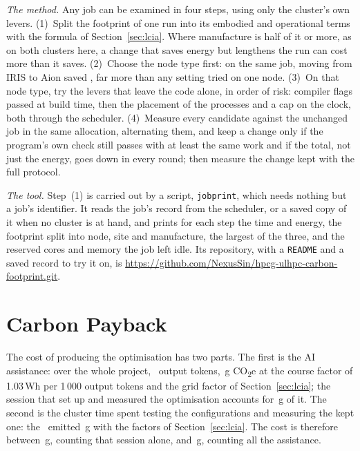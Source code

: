 \documentclass[conference,a4paper]{IEEEtran}
\newcommand{\ProjectRepo}{\url{https://github.com/NexusSin/hpcg-ulhpc-carbon-footprint.git}}
\begin{document}
\emph{The method.} Any job can be examined in four steps, using only the
cluster's own levers. (1)~Split the footprint of one run into its embodied and
operational terms with the formula of Section~\ref{sec:lcia}. Where manufacture
is half of it or more, as on both clusters here, a change that saves energy but
lengthens the run can cost more than it saves. (2)~Choose the node type first:
on the same job, moving from IRIS to Aion saved \AionSave, far more than any
setting tried on one node. (3)~On that node type, try the levers that leave the
code alone, in order of risk: compiler flags passed at build time, then the
placement of the processes and a cap on the clock, both through the scheduler.
(4)~Measure every candidate against the unchanged job in the same allocation,
alternating them, and keep a change only if the program's own check still passes
with at least the same work and if the total, not just the energy, goes down in
every round; then measure the change kept with the full protocol.

\emph{The tool.} Step~(1) is carried out by a script, \texttt{jobprint}, which
needs nothing but a job's identifier. It reads the job's record from the
scheduler, or a saved copy of it when no cluster is at hand, and prints for each
step the time and energy, the footprint split into node, site and manufacture,
the largest of the three, and the reserved cores and memory the job left idle.
Its repository, with a \texttt{README} and a saved record to try it on, is
\ProjectRepo.

\section{Carbon Payback}\label{sec:payback}

The cost of producing the optimisation has two parts. The first is the AI
assistance: over the whole project, \AssistOut\ output tokens, \AssistGrams\,g
CO\textsubscript{2}e at the course factor of 1.03\,Wh per 1\,000 output tokens
and the grid factor of Section~\ref{sec:lcia}; the
session that set up and measured the optimisation accounts for \AssistOptGrams\,g
of it. The second is the cluster time spent testing the configurations and
measuring the kept one: the \OptCampaignText\ emitted \OptCampaignGramsAll\,g
with the factors of Section~\ref{sec:lcia}. The cost is therefore between \PaybackCostLo\,g, counting
that session alone, and \PaybackCostHi\,g, counting all the assistance.
\end{document}
